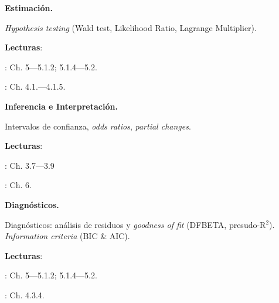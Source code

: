 \documentclass[letterpaper]{article}
\renewenvironment{itemize}{
  \begin{list}{}{
    \setlength{\leftmargin}{1.5em}
  }
}{
  \end{list}
}
\begin{document}
\begin{enumerate}[label=\roman*.]
     
       \begin{itemize} 
        \item[12.] {\bf Estimaci\'on.}
        \begin{itemize} 
          \item[$\circ$] \emph{Hypothesis testing} (Wald test, Likelihood Ratio, Lagrange Multiplier).
          \item[$\circ$] {\bf Lecturas}: 
            \begin{itemize} 
              \item[$\diamond$] \textcite{Ward2018}: Ch. 5---5.1.2; 5.1.4---5.2.
              \item[$\diamond$] \textcite{Long2001}: Ch. 4.1.---4.1.5.
            \end{itemize}
        \end{itemize}
      \end{itemize}


        \begin{itemize} 
        \item[13.] {\bf Inferencia e Interpretaci\'on.}
        \begin{itemize} 
          \item[$\circ$] Intervalos de confianza, \emph{odds ratios}, \emph{partial changes}.
          \item[$\circ$] {\bf Lecturas}: 
            \begin{itemize} 
              \item[$\diamond$] \textcite{Long2001}: Ch. 3.7---3.9
              \item[$\diamond$] \textcite{Ward2018}: Ch. 6.
            \end{itemize}
        \end{itemize}
      \end{itemize}


       \begin{itemize} 
        \item[14.] {\bf Diagn\'osticos.}
        \begin{itemize} 
          \item[$\circ$] Diagn\'osticos: an\'alisis de residuos y \emph{goodness of fit} (DFBETA, presudo-R$^{2}$). \emph{Information criteria} (BIC \& AIC).
          \item[$\circ$] {\bf Lecturas}: 
            \begin{itemize} 
              \item[$\diamond$] \textcite{Ward2018}: Ch. 5---5.1.2; 5.1.4---5.2.
              \item[$\diamond$] \textcite{Long2001}: Ch. 4.3.4.
            \end{itemize}
        \end{itemize}
      \end{itemize}
			


\end{enumerate}
\end{document}
